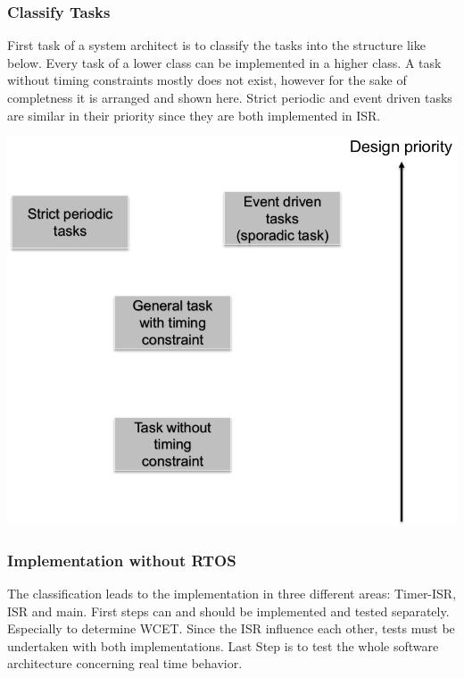\subsubsection{Classify Tasks}
\begin{minipage}[b]{0.6\textwidth}
	First task of a system architect is to classify the tasks into the structure like below.
	Every task of a lower class can be implemented in a higher class.
	A task without timing constraints mostly does not exist, however for the sake of completness it is arranged and shown here.
	Strict periodic and event driven tasks are similar in their priority since they are both implemented in ISR.
\end{minipage}
\begin{minipage}{0.39\textwidth}
	\includegraphics[width=\textwidth]{images/DesignStrategy/classify_tasks.png}
\end{minipage}


\subsubsection{Implementation without RTOS}
The classification leads to the implementation in three different areas: Timer-ISR, ISR and main.
First steps can and should be implemented and tested separately.
Especially to determine WCET.
Since the ISR influence each other, tests must be undertaken with both implementations.
Last Step is to test the whole software architecture concerning real time behavior.

